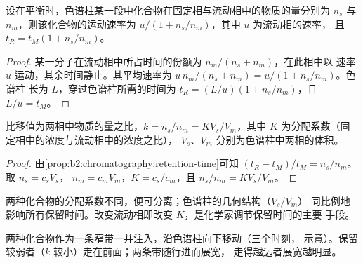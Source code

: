 \begin{proposition}[保留时间]\label{prop:b2:chromatography:retention-time}
设在平衡时，色谱柱某一段中化合物在固定相与流动相中的物质的量分别为
$n_s$ 与 $n_m$，则该化合物的运动速率为 $u/(1 + n_s/n_m)$，其中 $u$ 为流动相的速率，
且 $t_R = t_M(1 + n_s/n_m)$。
\end{proposition}

\begin{proof}
某一分子在流动相中所占时间的份额为 $n_m/(n_s + n_m)$，在此相中以
速率 $u$ 运动，其余时间静止。其平均速率为 $u\,n_m/(n_s + n_m) = u/(1 + n_s/n_m)$。色谱柱
长为 $L$，穿过色谱柱所需的时间为 $t_R = (L/u)(1 + n_s/n_m)$，且 $L/u = t_M$。
\end{proof}

\begin{proposition}[保留与分配]\label{prop:b2:chromatography:k-and-K}
比移值为两相中物质的量之比，$k = n_s/n_m = KV_s/V_m$，其中 $K$
为分配系数（固定相中的浓度与流动相中的浓度之比），
$V_s$、$V_m$ 分别为色谱柱中两相的体积。
\end{proposition}

\begin{proof}
由\cref{prop:b2:chromatography:retention-time}可知 $(t_R - t_M)/t_M = n_s/n_m$。取 $n_s = c_sV_s$，
$n_m = c_mV_m$，$K = c_s/c_m$，且 $n_s/n_m = KV_s/V_m$。
\end{proof}

两种化合物的分配系数不同，便可分离；色谱柱的几何结构（$V_s/V_m$）
同比例地影响所有保留时间。改变流动相即改变 $K$，是化学家调节保留时间的主要
手段。

\begin{omfigure}
\par\vspace{4pt}

{\small 两种化合物作为一条窄带一并注入，沿色谱柱向下移动（三个时刻，
示意）。保留较弱者（$k$ 较小）走在前面；两条带随行进而展宽，
走得越远者展宽越明显。}
\end{omfigure}

